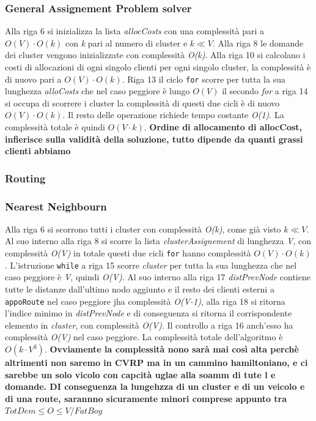 \documentclass[]{article}
\begin{document}
\subsubsection{General Assignement Problem solver}
Alla riga 6 si inizializza la lista \textit{allocCosts} con una complessità  pari a \emph{$O(V) \cdot O(k)$} con \emph{k} pari al numero di cluster e \emph{$ k \ll V $}. Alla riga 8 le domande dei cluster vengono inizializzate con complessità \emph{O(k)}. Alla riga 10 si calcolano i costi di allocazioni di ogni singolo clienti per ogni singolo cluster, la complessità è di nuovo  pari a \emph{$O(V) \cdot O(k)$}. Riga 13 il ciclo \texttt{for} scorre per tutta la sua lunghezza \textit{alloCosts} che nel caso peggiore è lungo \emph{$O(V)$} il secondo \emph{for} a riga 14 si occupa di scorrere i cluster la complessità di questi due cicli è di nuovo \emph{$O(V) \cdot O(k)$}. Il resto delle operazione richiede tempo costante \emph{O(1)}. La complessità totale è quindi \emph{$O(V \cdot k)$}.
\textbf{Ordine di allocamento di allocCost, infierisce sulla validità della soluzione, tutto dipende da quanti grassi clienti abbiamo}

\subsubsection{Routing}
 
\subsubsection{Nearest Neighbourn}
Alla riga 6 si scorrono tutti i cluster con complessità \emph{O(k)}, come già visto  \emph{$ k \ll V $}. Al suo interno  alla riga 8 si scorre la lista \textit{clusterAssignement} di lunghezza \emph{V}, con complessità \emph{O(V)} in totale questi due cicli \texttt{for} hanno complessità \emph{$O(V) \cdot O(k)$}.
L'istruzione \texttt{while} a riga 15 scorre \textit{cluster} per tutta la sua lunghezza che nel caso peggiore è \emph{V}, quindi \emph{O(V)}. Al suo interno alla riga 17 \textit{distPrevNode} contiene tutte le distanze dall'ultimo nodo aggiunto e il resto dei clienti esterni a \texttt{appoRoute} nel caso peggiore jha complessità \emph{O(V-1)}, alla riga 18 si ritorna l'indice minimo in \textit{distPrevNode} e di conseguenza si ritorna il corrispondente elemento in \textit{cluster}, con complessità \emph{O(V)}. Il controllo a riga 16 anch'esso ha complessità \emph{O(V)} nel caso peggiore. La complessità totale dell'algoritmo è 
\emph{$O(k \cdot V^3)$}. 
\textbf{Ovviamente la complessità nono sarà mai così alta perchè altrimenti non saremo in CVRP ma in un cammino hamiltoniano, e ci sarebbe un solo vicolo con capcità uglae alla soamm di tute l e domande. DI conseguenza la lungehzza di un cluster e di un veicolo e di una route, sarannno sicuramente minori comprese appunto tra  \emph{$TotDem \leq O \leq V/FatBoy$} }
\end{document}
